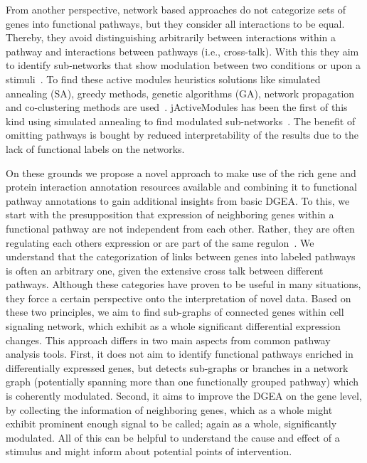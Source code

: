 \documentclass[10pt,a4paper,twocolumn]{article}
\begin{document}
	From another perspective, network based approaches do not
        categorize sets of genes into functional pathways, but they
        consider all interactions to be equal. Thereby, they avoid
        distinguishing arbitrarily between interactions within a
        pathway and interactions between pathways (i.e.,
        cross-talk). With this they aim to identify sub-networks that
        show modulation between two conditions or upon a
        stimuli~\cite{mitra_carvunis_ramesh_ideker_2013}. To find
        these active modules heuristics solutions like simulated
        annealing (SA), greedy methods, genetic algorithms (GA),
        network propagation and co-clustering methods are
        used~\cite{mitra_carvunis_ramesh_ideker_2013}. jActiveModules
        has been the first of this kind using simulated annealing to
        find modulated sub-networks~\cite{jActiveModules}. The benefit
        of omitting pathways is bought by reduced interpretability of
        the results due to the lack of functional labels on the
        networks.
		
    On these grounds we propose a novel approach to make use of the rich gene
	and protein interaction annotation resources available and combining it to functional pathway annotations to gain additional insights from basic DGEA. To this, we start with the
	presupposition that expression of neighboring genes within a functional
	pathway are not independent from each other. Rather, they are often
	regulating each others expression or are part of the same
	regulon~\cite{Michalak}. We understand that the categorization of links
	between genes into labeled pathways is often an arbitrary one, given the
	extensive cross talk between different pathways. Although these categories
	have proven to be useful in many situations, they force a certain
	perspective onto the interpretation of novel data. Based on these two
	principles, we aim to find sub-graphs of connected genes within cell
	signaling network, which exhibit as a whole significant differential
	expression changes. This approach differs in two main aspects from common
	pathway analysis tools. First, it does not aim to identify functional
	pathways enriched in differentially expressed genes, but detects sub-graphs
	or branches in a network graph (potentially spanning more than one
	functionally grouped pathway) which is coherently modulated. Second, it
	aims to improve the DGEA on the gene level, by collecting the information
	of neighboring genes, which as a whole might exhibit prominent enough
	signal to be called; again as a whole, significantly modulated. All of this can be helpful to understand the cause and effect of a stimulus and might inform about potential points of intervention.
	
\end{document}

